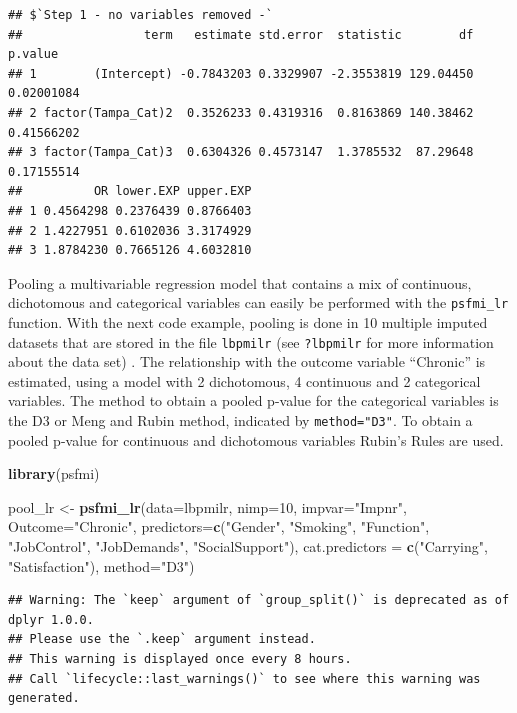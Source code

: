 \documentclass[
]{book}
\newenvironment{Shaded}{\begin{snugshade}}{\end{snugshade}}
\newcommand{\DataTypeTok}[1]{\textcolor[rgb]{0.13,0.29,0.53}{#1}}
\newcommand{\DecValTok}[1]{\textcolor[rgb]{0.00,0.00,0.81}{#1}}
\newcommand{\KeywordTok}[1]{\textcolor[rgb]{0.13,0.29,0.53}{\textbf{#1}}}
\newcommand{\NormalTok}[1]{#1}
\newcommand{\StringTok}[1]{\textcolor[rgb]{0.31,0.60,0.02}{#1}}
\begin{document}
\begin{verbatim}
## $`Step 1 - no variables removed -`
##                 term   estimate std.error  statistic        df    p.value
## 1        (Intercept) -0.7843203 0.3329907 -2.3553819 129.04450 0.02001084
## 2 factor(Tampa_Cat)2  0.3526233 0.4319316  0.8163869 140.38462 0.41566202
## 3 factor(Tampa_Cat)3  0.6304326 0.4573147  1.3785532  87.29648 0.17155514
##          OR lower.EXP upper.EXP
## 1 0.4564298 0.2376439 0.8766403
## 2 1.4227951 0.6102036 3.3174929
## 3 1.8784230 0.7665126 4.6032810
\end{verbatim}

Pooling a multivariable regression model that contains a mix of continuous, dichotomous and categorical variables can easily be performed with the \texttt{psfmi\_lr} function. With the next code example, pooling is done in 10 multiple imputed datasets that are stored in the file \texttt{lbpmilr} (see \texttt{?lbpmilr} for more information about the data set) . The relationship with the outcome variable ``Chronic'' is estimated, using a model with 2 dichotomous, 4 continuous and 2 categorical variables. The method to obtain a pooled p-value for the categorical variables is the D3 or Meng and Rubin method, indicated by \texttt{method="D3"}. To obtain a pooled p-value for continuous and dichotomous variables Rubin's Rules are used.

\begin{Shaded}
\begin{Highlighting}[]
\KeywordTok{library}\NormalTok{(psfmi)}

\NormalTok{pool_lr <-}\StringTok{ }\KeywordTok{psfmi_lr}\NormalTok{(}\DataTypeTok{data=}\NormalTok{lbpmilr, }\DataTypeTok{nimp=}\DecValTok{10}\NormalTok{, }\DataTypeTok{impvar=}\StringTok{"Impnr"}\NormalTok{, }\DataTypeTok{Outcome=}\StringTok{"Chronic"}\NormalTok{,}
  \DataTypeTok{predictors=}\KeywordTok{c}\NormalTok{(}\StringTok{"Gender"}\NormalTok{, }\StringTok{"Smoking"}\NormalTok{, }\StringTok{"Function"}\NormalTok{, }\StringTok{"JobControl"}\NormalTok{, }\StringTok{"JobDemands"}\NormalTok{,}
  \StringTok{"SocialSupport"}\NormalTok{), }\DataTypeTok{cat.predictors =} \KeywordTok{c}\NormalTok{(}\StringTok{"Carrying"}\NormalTok{, }\StringTok{"Satisfaction"}\NormalTok{), }
  \DataTypeTok{method=}\StringTok{"D3"}\NormalTok{)}
\end{Highlighting}
\end{Shaded}

\begin{verbatim}
## Warning: The `keep` argument of `group_split()` is deprecated as of dplyr 1.0.0.
## Please use the `.keep` argument instead.
## This warning is displayed once every 8 hours.
## Call `lifecycle::last_warnings()` to see where this warning was generated.
\end{verbatim}
\end{document}

